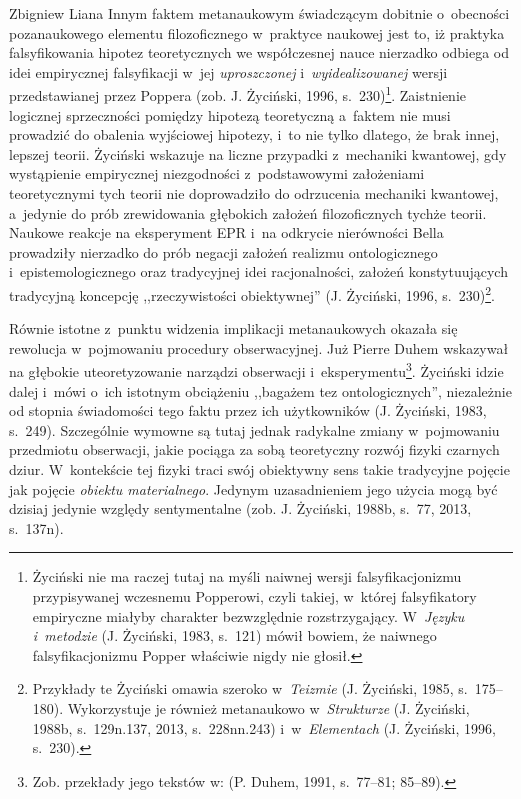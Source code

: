 \begin{artplenv}{Zbigniew Liana}
Innym faktem metanaukowym świadczącym dobitnie o~obecności pozanaukowego elementu filozoficznego w~praktyce naukowej
jest to, iż praktyka falsyfikowania hipotez teoretycznych we współczesnej nauce nierzadko odbiega od idei empirycznej
falsyfikacji w~jej \textit{uproszczonej} i~\textit{wyidealizowanej} wersji przedstawianej przez Poppera
\label{ref:RNDLar942AozJ}(zob. J. Życiński, 1996, s.~230)\footnote{Życiński nie ma raczej tutaj na myśli naiwnej wersji
falsyfikacjonizmu przypisywanej wczesnemu Popperowi, czyli takiej, w~której falsyfikatory empiryczne miałyby charakter
bezwzględnie rozstrzygający. W~\textit{Języku i~metodzie} \label{ref:RNDyLCTuOy1b8}(J. Życiński, 1983, s.~121) mówił
bowiem, że naiwnego falsyfikacjonizmu Popper właściwie nigdy nie głosił.}. Zaistnienie logicznej sprzeczności pomiędzy
hipotezą teoretyczną a~faktem nie musi prowadzić do obalenia wyjściowej hipotezy, i~to nie tylko dlatego, że brak
innej, lepszej teorii. Życiński wskazuje na liczne przypadki z~mechaniki kwantowej, gdy wystąpienie empirycznej
niezgodności z~podstawowymi założeniami teoretycznymi tych teorii nie doprowadziło do odrzucenia mechaniki kwantowej, a~jedynie
do prób zrewidowania głębokich założeń filozoficznych tychże teorii. Naukowe reakcje na eksperyment EPR i~na
odkrycie nierówności Bella prowadziły nierzadko do prób negacji założeń realizmu ontologicznego i~epistemologicznego
oraz tradycyjnej idei racjonalności, założeń konstytuujących tradycyjną koncepcję ,,rzeczywistości obiektywnej''
\label{ref:RND9B582PV6dW}(J. Życiński, 1996, s.~230)\footnote{Przykłady te Życiński omawia szeroko w~\textit{Teizmie}
\label{ref:RNDeDVxzhZtXS}(J. Życiński, 1985, s.~175–180). Wykorzystuje je również metanaukowo w~\textit{Strukturze}
\label{ref:RNDYDcMfhVjkQ}(J. Życiński, 1988b, s.~129n.137, 2013, s.~228nn.243) i~w~\textit{Elementach}
\label{ref:RNDMGOXueF4r7}(J. Życiński, 1996, s.~230).}.

Równie istotne z~punktu widzenia implikacji metanaukowych okazała się rewolucja w~pojmowaniu procedury obserwacyjnej.
Już Pierre Duhem wskazywał na głębokie uteoretyzowanie narządzi obserwacji i~eksperymentu\footnote{Zob. przekłady jego
tekstów w: \label{ref:RND7H3en34uaC}(P. Duhem, 1991, s.~77–81; 85–89).}. Życiński idzie dalej i~mówi o~ich istotnym
obciążeniu ,,bagażem tez ontologicznych'', niezależnie od stopnia świadomości tego faktu przez ich użytkowników
\label{ref:RND1c8rmkjZxD}(J. Życiński, 1983, s.~249). Szczególnie wymowne są tutaj jednak radykalne zmiany w~pojmowaniu
przedmiotu obserwacji, jakie pociąga za sobą teoretyczny rozwój fizyki czarnych dziur. W~kontekście tej fizyki traci
swój obiektywny sens takie tradycyjne pojęcie jak pojęcie \textit{obiektu materialnego}. Jedynym uzasadnieniem jego
użycia mogą być dzisiaj jedynie względy sentymentalne \label{ref:RNDdNrJ37wYMr}(zob. J. Życiński, 1988b, s.~77, 2013,
s.~137n).


\end{artplenv}
